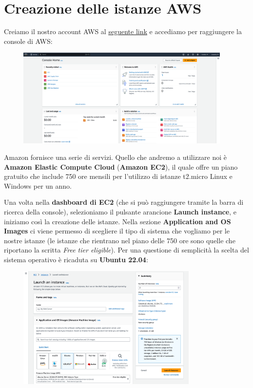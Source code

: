 \section{Creazione delle istanze AWS}

Creiamo il nostro account AWS al \underline{\href{https://aws.amazon.com/it/}{seguente link}} e accediamo per raggiungere la console di AWS:

\begin{figure}[H]
    \centering
    \includegraphics[width=0.95\textwidth]{images/aws-console.png}
\end{figure}

Amazon fornisce una serie di servizi. Quello che andremo a utilizzare noi è \textbf{Amazon Elastic Compute Cloud} (\textbf{Amazon EC2}), il quale offre un piano gratuito che include 750 ore mensili per l'utilizzo di istanze t2.micro Linux e Windows per un anno.

Una volta nella \textbf{dashboard di EC2} (che si può raggiungere tramite la barra di ricerca della console), selezioniamo il pulsante arancione \textbf{Launch instance}, e iniziamo così la creazione delle istanze.
Nella sezione \textbf{Application and OS Images} ci viene permesso di scegliere il tipo di sistema che vogliamo per le nostre istanze (le istanze che rientrano nel piano delle 750 ore sono quelle che riportano la scritta \textit{Free tier eligible}). Per una questione di semplicità la scelta del sistema operativo è ricaduta su \textbf{Ubuntu 22.04}:

\begin{figure}[H]
    \centering
    \includegraphics[width=0.8\textwidth]{images/vm-selection.png}
\end{figure}

